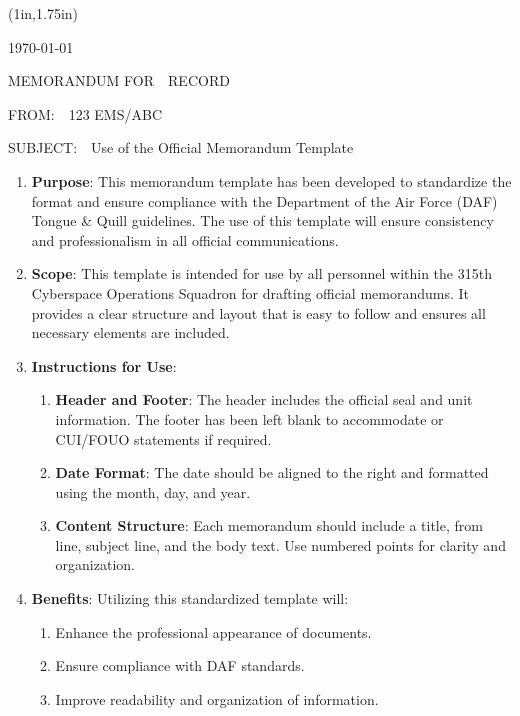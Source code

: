 \documentclass[12pt]{article}
\newenvironment{memoblock}{
    \begin{textblock*}{\textwidth}(1in,1.75in)
    \noindent
}{
    \end{textblock*}
}
\newenvironment{memolist}[1][]{
    \begin{enumerate}[labelsep=0.4em,leftmargin=0pt,itemindent=14pt,#1]
}{
    \end{enumerate}
}
\newenvironment{submemolist}{
    \begin{enumerate}[labelsep=0.2em,leftmargin=1.2em,itemindent=14pt,label=\alph*.~ ]
}{
    \end{enumerate}
}
\begin{document}
\thispagestyle{firstpage}

\begin{memoblock}

\hfill\monthyeardate\today

\noindent MEMORANDUM FOR~~RECORD

\noindent FROM:~~123 EMS/ABC

\noindent SUBJECT:~~Use of the Official Memorandum Template

\begin{memolist}
    \item \textbf{Purpose}: This memorandum template has been developed to standardize the format and ensure compliance with the Department of the Air Force (DAF) Tongue \& Quill guidelines. The use of this template will ensure consistency and professionalism in all official communications.
    
    \item \textbf{Scope}: This template is intended for use by all personnel within the 315th Cyberspace Operations Squadron for drafting official memorandums. It provides a clear structure and layout that is easy to follow and ensures all necessary elements are included.
    
    \item \textbf{Instructions for Use}:
        \begin{submemolist}
            \item \textbf{Header and Footer}: The header includes the official seal and unit information. The footer has been left blank to accommodate or CUI/FOUO statements if required.
            \item \textbf{Date Format}: The date should be aligned to the right and formatted using the month, day, and year.
            \item \textbf{Content Structure}: Each memorandum should include a title, from line, subject line, and the body text. Use numbered points for clarity and organization.
        \end{submemolist}
    
    \item \textbf{Benefits}: Utilizing this standardized template will:
        \begin{submemolist}
            \item Enhance the professional appearance of documents.
            \item Ensure compliance with DAF standards.
            \item Improve readability and organization of information.
        \end{submemolist}
    

\end{memolist}
\end{memoblock}
\end{document}
